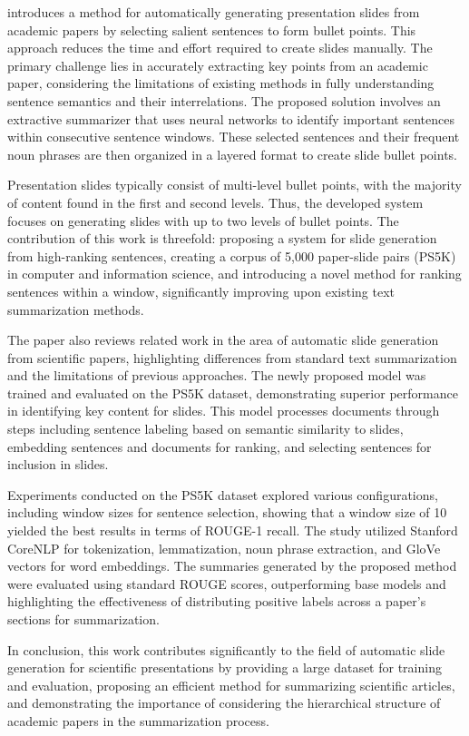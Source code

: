 \citet{Sefid:2021:arXiv} introduces a method for automatically generating presentation slides from academic papers by selecting salient sentences to form bullet points. This approach reduces the time and effort required to create slides manually. The primary challenge lies in accurately extracting key points from an academic paper, considering the limitations of existing methods in fully understanding sentence semantics and their interrelations. The proposed solution involves an extractive summarizer that uses neural networks to identify important sentences within consecutive sentence windows. These selected sentences and their frequent noun phrases are then organized in a layered format to create slide bullet points.

Presentation slides typically consist of multi-level bullet points, with the majority of content found in the first and second levels. Thus, the developed system focuses on generating slides with up to two levels of bullet points. The contribution of this work is threefold: proposing a system for slide generation from high-ranking sentences, creating a corpus of 5,000 paper-slide pairs (PS5K) in computer and information science, and introducing a novel method for ranking sentences within a window, significantly improving upon existing text summarization methods.

The paper also reviews related work in the area of automatic slide generation from scientific papers, highlighting differences from standard text summarization and the limitations of previous approaches. The newly proposed model was trained and evaluated on the PS5K dataset, demonstrating superior performance in identifying key content for slides. This model processes documents through steps including sentence labeling based on semantic similarity to slides, embedding sentences and documents for ranking, and selecting sentences for inclusion in slides.

Experiments conducted on the PS5K dataset explored various configurations, including window sizes for sentence selection, showing that a window size of 10 yielded the best results in terms of ROUGE-1 recall. The study utilized Stanford CoreNLP for tokenization, lemmatization, noun phrase extraction, and GloVe vectors for word embeddings. The summaries generated by the proposed method were evaluated using standard ROUGE scores, outperforming base models and highlighting the effectiveness of distributing positive labels across a paper's sections for summarization.

In conclusion, this work contributes significantly to the field of automatic slide generation for scientific presentations by providing a large dataset for training and evaluation, proposing an efficient method for summarizing scientific articles, and demonstrating the importance of considering the hierarchical structure of academic papers in the summarization process.

